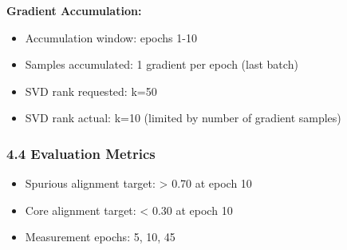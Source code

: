 \textbf{Gradient Accumulation:}
\begin{itemize}
\item Accumulation window: epochs 1-10
\item Samples accumulated: 1 gradient per epoch (last batch)
\item SVD rank requested: k=50
\item SVD rank actual: k=10 (limited by number of gradient samples)
\end{itemize}

\subsubsection{4.4 Evaluation Metrics}

\begin{itemize}
\item Spurious alignment target: > 0.70 at epoch 10
\item Core alignment target: < 0.30 at epoch 10
\item Measurement epochs: 5, 10, 45
\end{itemize}

